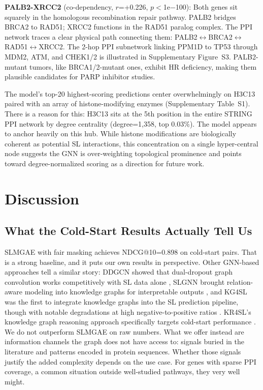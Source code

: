\documentclass[12pt,a4paper]{article}
\begin{document}
\textbf{PALB2-XRCC2} (co-dependency, $r$=+0.226, $p$$<$1e$-$100): Both genes sit squarely in the homologous recombination repair pathway. PALB2 bridges BRCA2 to RAD51; XRCC2 functions in the RAD51 paralog complex. The PPI network traces a clear physical path connecting them: PALB2$\leftrightarrow$BRCA2$\leftrightarrow$RAD51$\leftrightarrow$XRCC2. The 2-hop PPI subnetwork linking PPM1D to TP53 through MDM2, ATM, and CHEK1/2 is illustrated in Supplementary Figure~S3. PALB2-mutant tumors, like BRCA1/2-mutant ones, exhibit HR deficiency, making them plausible candidates for PARP inhibitor studies.

The model's top-20 highest-scoring predictions center overwhelmingly on H3C13 paired with an array of histone-modifying enzymes (Supplementary Table~S1). There is a reason for this: H3C13 sits at the 5th position in the entire STRING PPI network by degree centrality (degree=1,358, top 0.03\%). The model appears to anchor heavily on this hub. While histone modifications are biologically coherent as potential SL interactions, this concentration on a single hyper-central node suggests the GNN is over-weighting topological prominence and points toward degree-normalized scoring as a direction for future work.

\section{Discussion}

\subsection{What the Cold-Start Results Actually Tell Us}

SLMGAE with fair masking achieves NDCG@10=0.898 on cold-start pairs. That is a strong baseline, and it puts our own results in perspective. Other GNN-based approaches tell a similar story: DDGCN showed that dual-dropout graph convolution works competitively with SL data alone \cite{cao2020}, SLGNN brought relation-aware modeling into knowledge graphs for interpretable outputs \cite{hao2023}, and KG4SL was the first to integrate knowledge graphs into the SL prediction pipeline, though with notable degradations at high negative-to-positive ratios \cite{wang2021}. KR4SL's knowledge graph reasoning approach specifically targets cold-start performance \cite{zhang2023}. We do not outperform SLMGAE on raw numbers. What we offer instead are information channels the graph does not have access to: signals buried in the literature and patterns encoded in protein sequences. Whether those signals justify the added complexity depends on the use case. For genes with sparse PPI coverage, a common situation outside well-studied pathways, they very well might.
\end{document}
